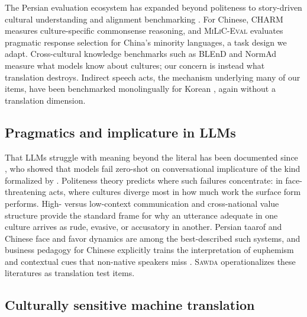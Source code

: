 \documentclass[11pt]{article}
\newcommand{\bench}{\textsc{Sawda}}
\begin{document}
The Persian evaluation ecosystem has expanded beyond politeness to story-driven cultural understanding \citep{monazzah2025percul} and alignment benchmarking \citep{pourbahman2025elab}. For Chinese, \textsc{CHARM} \citep{charm2024} measures culture-specific commonsense reasoning, and \textsc{MiLiC-Eval} \citep{milic2025} evaluates pragmatic response selection for China's minority languages, a task design we adapt. Cross-cultural knowledge benchmarks such as BLEnD \citep{myung2024blend} and NormAd \citep{rao2024normad} measure what models know about cultures; our concern is instead what translation destroys. Indirect speech acts, the mechanism underlying many of our items, have been benchmarked monolingually for Korean \citep{korean2025indirect}, again without a translation dimension.

\subsection{Pragmatics and implicature in LLMs}

That LLMs struggle with meaning beyond the literal has been documented since \citet{ruis2022implicature}, who showed that models fail zero-shot on conversational implicature of the kind formalized by \citet{grice1975}. Politeness theory \citep{brownlevinson1987} predicts where such failures concentrate: in face-threatening acts, where cultures diverge most in how much work the surface form performs. High- versus low-context communication \citep{hall1976} and cross-national value structure \citep{hofstede2001} provide the standard frame for why an utterance adequate in one culture arrives as rude, evasive, or accusatory in another. Persian taarof \citep{beeman1986, koutlaki2002} and Chinese face and favor dynamics \citep{hwang1987} are among the best-described such systems, and business pedagogy for Chinese explicitly trains the interpretation of euphemism and contextual cues that non-native speakers miss \citep{bcpragmatics2025}. \bench{} operationalizes these literatures as translation test items.

\subsection{Culturally sensitive machine translation}
\end{document}
